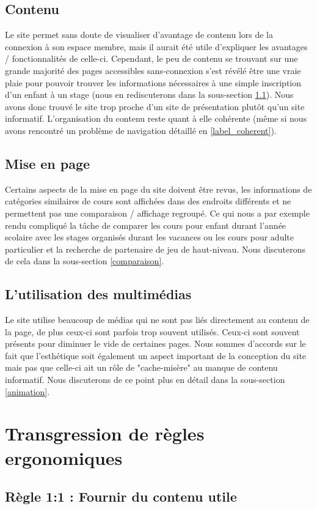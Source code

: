 \documentclass{article}[12pt]
\begin{document}
\subsection{Contenu}
Le site permet sans doute de visualiser d'avantage de contenu lors de la connexion à son espace membre, mais il aurait été utile d'expliquer les avantages / fonctionnalités de celle-ci. Cependant, le peu de contenu se trouvant sur une grande majorité des pages accessibles sans-connexion s'est révélé être une vraie plaie pour pouvoir trouver les informations nécessaires à une simple inscription d'un enfant à un stage (nous en rediscuterons dans la sous-section \ref{1_1}). Nous avons donc trouvé le site trop proche d'un site de présentation plutôt qu'un site informatif. L'organisation du contenu reste quant à elle cohérente (même si nous avons rencontré un problème de navigation détaillé en \ref{label_coherent}). 
\subsection{Mise en page}
Certains aspects de la mise en page du site doivent être revus, les informations de catégories similaires de cours sont affichées dans des endroits différents et ne permettent pas une comparaison / affichage regroupé. Ce qui nous a par exemple rendu compliqué la tâche de comparer les cours pour enfant durant l'année scolaire avec les stages organisés durant les vacances ou les cours pour adulte particulier et la recherche de partenaire de jeu de haut-niveau. Nous discuterons de cela dans la sous-section \ref{comparaison}.
\subsection{L'utilisation des multimédias }
  Le site utilise beaucoup de médias qui ne sont pas liés directement au contenu de la page, de plus ceux-ci sont parfois trop souvent utilisés. Ceux-ci sont souvent présents pour diminuer le vide de certaines pages. Nous sommes d'accords sur le fait que l'esthétique soit également un aspect important de la conception du site mais pas que celle-ci ait un rôle de "cache-misère" au manque de contenu informatif. Nous discuterons de ce point plus en détail dans la sous-section \ref{animation}.

\newpage
\section{Transgression de règles ergonomiques}
	\subsection{Règle 1:1 : Fournir du contenu utile }
    \label{1_1}
\end{document}
